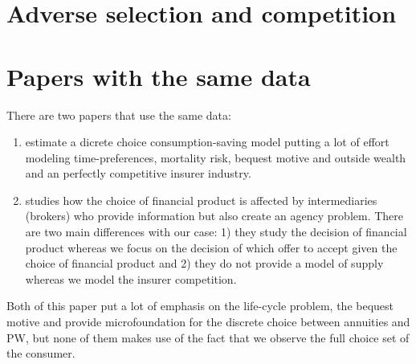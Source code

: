 \documentclass[12pt]{article}
\theoremstyle{plain}
\theoremstyle{plain}
\begin{document}
\section{Adverse selection and competition}

\section{Papers with the same data}

There are two papers that use the same data: 
\begin{enumerate}
    \item \textcite{illanes_retirement_2019} 
    estimate a dicrete choice consumption-saving model putting a lot of effort modeling time-preferences, mortality risk, bequest motive and outside wealth and an perfectly competitive insurer industry. 
    
    \item \textcite{boehm_intermediation_2024} studies how the choice of financial product is affected by intermediaries (brokers) who provide information but also create an agency problem. There are two main differences with our case: 1) they study the decision of financial product whereas we focus on the decision of which offer to accept given the choice of financial product and 2) they do not provide a model of supply whereas we model the insurer competition. 
\end{enumerate}
Both of this paper put a lot of emphasis on the life-cycle problem, the bequest motive and provide microfoundation for the discrete choice between annuities and PW, but none of them makes use of the fact that we observe the full choice set of the consumer. 




\printbibliography
 
\end{document}
